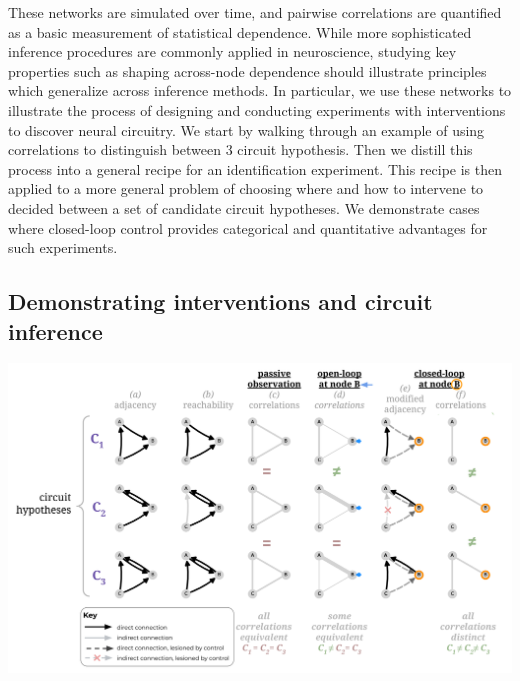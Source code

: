 \documentclass{article}
\begin{document}
These networks are simulated over time, and pairwise correlations are quantified as a basic measurement of statistical dependence. While more sophisticated inference procedures are commonly applied in neuroscience, studying key properties such as shaping across-node dependence should illustrate principles which generalize across inference methods. In particular, we use these networks to illustrate the process of designing and conducting experiments with interventions to discover neural circuitry. We start by walking through an example of using correlations to distinguish between 3 circuit hypothesis. Then we distill this process into a general recipe for an identification experiment. This recipe is then applied to a more general problem of choosing where and how to intervene to decided between a set of candidate circuit hypotheses. We demonstrate cases where closed-loop control provides categorical and quantitative advantages for such experiments.

\hypertarget{demonstrating-interventions-and-circuit-inference}{%
\subsection{Demonstrating interventions and circuit inference}\label{demonstrating-interventions-and-circuit-inference}}

\includegraphics[width=1.0\textwidth]{figures/core_figure_sketches/circuit_walkthrough_3circuits_annotated.png}
\end{document}
